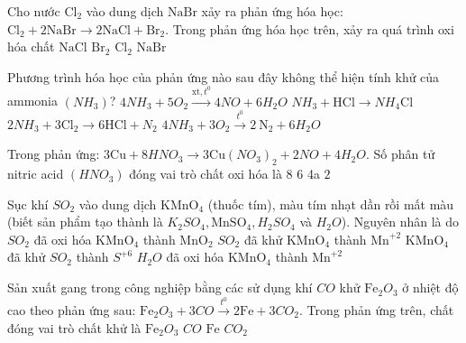 \begin{ex}Cho nước $\mathrm{Cl}_2$ vào dung dịch $\mathrm{NaBr}$ xảy ra phản ứng hóa học: $\mathrm{Cl}_2+2\mathrm{NaBr} \to 2\mathrm{NaCl}+\mathrm{Br}_2$. Trong phản ứng hóa học trên, xảy ra quá trình oxi hóa chất
	\choice
	{$\mathrm{NaCl}$}
	{$\mathrm{Br}_2$}
	{$\mathrm{Cl}_2$}
	{\True $\mathrm{NaBr}$}
	\loigiai{}
\end{ex}

\begin{ex}Phương trình hóa học của phản ứng nào sau đây không thể hiện tính khử của ammonia $\left(NH_3\right)$?
	\choice
	{$4 NH_3+5 O_2 \xrightarrow{\mathrm{xt}, t^0} 4 NO+6 H_2O$}
	{\True $NH_3+\mathrm{HCl} \to NH_4\mathrm{Cl}$}
	{$2NH_3+3\mathrm{Cl}_2\to 6\mathrm{HCl}+N_2$}
	{$4 NH_3+3 O_2 \xrightarrow{t^0} 2 \mathrm{~N}_2+6 H_2O$}
	\loigiai{}
\end{ex}

\begin{ex}Trong phản ứng: $3 \mathrm{Cu}+8 HNO_3 \to 3 \mathrm{Cu}\left(NO_3\right)_2+2 NO+4 H_2O$. Số phân tử nitric acid $\left(HNO_3\right)$ đóng vai trò chất oxi hóa là
	\choice
	{$8$}
	{$6$}
	{4a}
	{\True $2$}
	\loigiai{}
\end{ex}

\begin{ex}[ĐHKA]
	Sục khí $SO_2$ vào dung dịch $\mathrm{KMnO}_4$ (thuốc tím), màu tím nhạt dần rồi mất màu (biết sản phẩm tạo thành là $K_2SO_4, \mathrm{MnSO}_4, H_2SO_4$ và $H_2O$). Nguyên nhân là do
	\choice
	{$SO_2$ đã oxi hóa $\mathrm{KMnO}_4$ thành $\mathrm{MnO}_2$}
	{\True $SO_2$ đã khử $\mathrm{KMnO}_4$ thành $\mathrm{Mn}^{+2}$}
	{$\mathrm{KMnO}_4$ đã khử $SO_2$ thành $S^{+6}$}
	{$H_2O$ đã oxi hóa $\mathrm{KMnO}_4$ thành $\mathrm{Mn}^{+2}$}
	\loigiai{}
\end{ex}

\begin{ex}Sản xuất gang trong công nghiệp bằng các sử dụng khí $CO$ khử $\mathrm{Fe}_2O_3$ ở nhiệt độ cao theo phản ứng sau: $\mathrm{Fe}_2O_3+3 CO \xrightarrow{t^0} 2 \mathrm{Fe}+3 CO_2$. Trong phản ứng trên, chất đóng vai trò chất khử là
	\choice
	{$\mathrm{Fe}_2O_3$}
	{\True $CO$}
	{$\mathrm{Fe}$}
	{$CO_2$}
	\loigiai{}
\end{ex}

